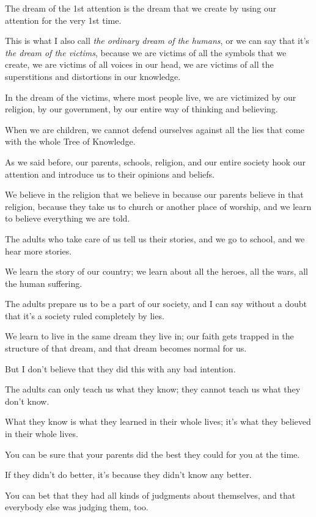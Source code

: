 \documentclass{article}
\numberwithin{equation}{section}
\begin{document}
%
The dream of the 1st attention is the dream that we create by using our attention for the very 1st time.

This is what I also call \textit{the ordinary dream of the humans}, or we can say that it's \textit{the dream of the victims}, because we are victims of all the symbols that we create, we are victims of all voices in our head, we are victims of all the superstitions and distortions in our knowledge.

In the dream of the victims, where most people live, we are victimized by our religion, by our government, by our entire way of thinking and believing.

%
When we are children, we cannot defend ourselves against all the lies that come with the whole Tree of Knowledge.

As we said before, our parents, schools, religion, and our entire society hook our attention and introduce us to their opinions and beliefs.

We believe in the religion that we believe in because our parents believe in that religion, because they take us to church or another place of worship, and we learn to believe everything we are told.

The adults who take care of us tell us their stories, and we go to school, and we hear more stories.

We learn the story of our country; we learn about all the heroes, all the wars, all the human suffering.

%
The adults prepare us to be a part of our society, and I can say without a doubt that it's a society ruled completely by lies.

We learn to live in the same dream they live in; our faith gets trapped in the structure of that dream, and that dream becomes normal for us.

But I don't believe that they did this with any bad intention.

The adults can only teach us what they know; they cannot teach us what they don't know.

What they know is what they learned in their whole lives; it's what they believed in their whole lives.

You can be sure that your parents did the best they could for you at the time.

If they didn't do better, it's because they didn't know any better.

You can bet that they had all kinds of judgments about themselves, and that everybody else was judging them, too.
\end{document}

